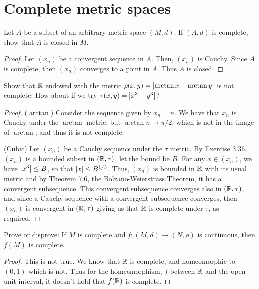 \section{Complete metric spaces}


\begin{exercise}{12}
Let $A$ be a subset of an arbitrary metric space $(M,d)$.
If $(A,d)$ is complete, show that $A$ is closed in $M$.
\end{exercise}
\begin{proof}
Let $(x_n)$ be a convergent sequence in $A$.
Then, $(x_n)$ is Cauchy.
Since $A$ is complete, then $(x_n)$ converges to a point in $A$.
Thus $A$ is closed.
\end{proof} 

\begin{exercise}{13}
Show that $\mathbb{R}$ endowed with the metric $\rho(x,y)=\left\lvert \arctan x-\arctan y\right\rvert$ is not complete.
How about if we try $\tau(x,y)=\left\lvert x^3-y^3\right\rvert$?
\end{exercise}
\begin{proof}
($\arctan$)
Consider the sequence given by $x_n = n$.
We have that $x_n$ is Cauchy under the $\arctan$ metric, but $\arctan n\to \pi/2$, which is not in the image of $\arctan$, and thus it is not complete.

(Cubic)
Let $(x_n)$ be a Cauchy sequence under the $\tau$ metric.
By Exercise 3.36, $(x_n)$ is a bounded subset in $(\mathbb{R},\tau)$, let the bound be $B$.
For any $x\in (x_n)$, we have $\left\lvert x^3\right\rvert\leq B$, so that $\left\lvert x\right\rvert\leq B^{1/3}$.
Thus, $(x_n)$ is bounded in $\mathbb{R}$ with its usual metric and by Theorem 7.6, the Bolzano-Weierstrass Theorem, it has a convergent subsequence.
This convergent subsequence converges also in $(\mathbb{R},\tau)$, and since a Cauchy sequence with a convergent subsequence converges, then $(x_n)$ is convergent in $(\mathbb{R},\tau)$ giving us that $\mathbb{R}$ is complete under $\tau$, as required.
\end{proof} 

\begin{exercise}{15}
Prove or disprove:
If $M$ is complete and $f:(M,d)\to (N,\rho)$ is continuous, then $f(M)$ is complete.
\end{exercise}
\begin{proof}
This is not true.
We know that $\mathbb{R}$ is complete, and homeomorphic to $(0,1)$ which is not.
Thus for the homeomorphism, $f$ between $\mathbb{R}$ and the open unit interval, it doesn't hold that $f(\mathbb{R})$ is complete.
\end{proof} 

